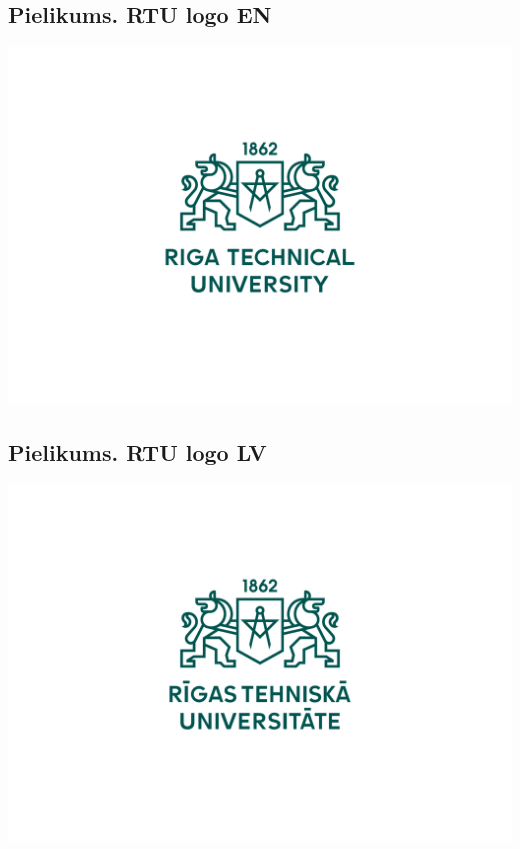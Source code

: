 \pagebreak
\begin{appendices}
\textit{ }
\vfill
{}
\vfill
\pagebreak
\renewcommand\thesubsection{\normalsize{\arabic{subsection}}}
\subsectionfont{\flushright }     %
%
%
\subsection{\normalsize{Pielikums. RTU logo EN}}\label{fig:pielikums1}
\includegraphics[width=.99\textwidth]{sections/pic/RTU_logotips_rgb_EN.pdf}
\pagebreak
\subsection{\normalsize{Pielikums. RTU logo LV}}\label{fig:pielikums2}
\includegraphics[width=.99\textwidth]{sections/pic/RTU_logotips_rgb_LV.pdf}
\end{appendices}
\pagebreak